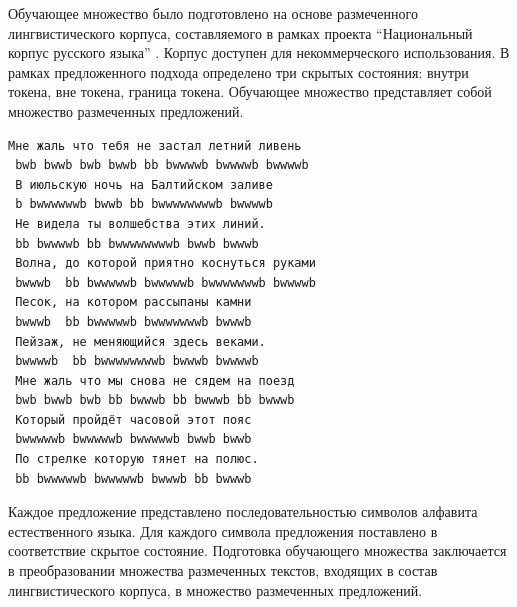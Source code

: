 Обучающее множество было подготовлено на основе размеченного лингвистического корпуса, составляемого в рамках проекта ``Национальный корпус русского языка'' \cite{natcorp_1, natcorp_2}. Корпус доступен для некоммерческого использования. В рамках предложенного подхода определено три скрытых состояния: внутри токена, вне токена, граница токена. Обучающее множество представляет собой множество размеченных предложений.
\begin{lstlisting}[caption={Фрагмент обучающего множества}]
 Мне жаль что тебя не застал летний ливень 
 bwb bwwb bwb bwwb bb bwwwwb bwwwwb bwwwwb
 В июльскую ночь на Балтийском заливе 
 b bwwwwwwb bwwb bb bwwwwwwwwb bwwwwb
 Не видела ты волшебства этих линий.
 bb bwwwwb bb bwwwwwwwwb bwwb bwwwb
 Волна, до которой приятно коснуться руками 
 bwwwb  bb bwwwwwb bwwwwwb bwwwwwwwb bwwwwb
 Песок, на котором рассыпаны камни 
 bwwwb  bb bwwwwwb bwwwwwwwb bwwwb
 Пейзаж, не меняющийся здесь веками.
 bwwwwb  bb bwwwwwwwwb bwwwb bwwwwb
 Мне жаль что мы снова не сядем на поезд 
 bwb bwwb bwb bb bwwwb bb bwwwb bb bwwwb
 Который пройдёт часовой этот пояс 
 bwwwwwb bwwwwwb bwwwwwb bwwb bwwb
 По стрелке которую тянет на полюс.
 bb bwwwwwb bwwwwwb bwwwb bb bwwwb
\end{lstlisting}
Каждое предложение представлено последовательностью символов алфавита естественного языка. Для каждого символа предложения поставлено в соответствие скрытое состояние. Подготовка обучающего множества заключается в преобразовании множества размеченных текстов, входящих в состав лингвистического корпуса, в множество размеченных предложений. 


